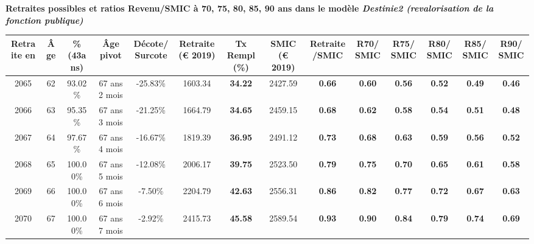  \vspace{0.1cm} 
{\bf \noindent Retraites possibles et ratios Revenu/SMIC à 70, 75, 80, 85, 90 ans dans le modèle \emph{Destinie2 (revalorisation de la fonction publique)}}  
 
\begin{adjustbox}{max width=\textwidth} 
\begin{tabular}[htb]{|c|c||c|c|c||c|c||c|c||c|c|c|c|c|} 
\hline 
 Retraite en &  Âge &  \%(43ans) &  Âge pivot &  Décote/Surcote &  Retraite (\euro{} 2019) &  Tx Rempl(\%) &  SMIC (\euro{} 2019) &  Retraite/SMIC &  R70/SMIC &  R75/SMIC &  R80/SMIC &  R85/SMIC &  R90/SMIC \\ 
\hline \hline 
 2065 &  62 &  93.02\% &  67 ans 2 mois &  -25.83\% &  1603.34 &  {\bf 34.22} &  2427.59 &  {\bf {\color{red} 0.66}} &  {\bf {\color{red} 0.60}} &  {\bf {\color{red} 0.56}} &  {\bf {\color{red} 0.52}} &  {\bf {\color{red} 0.49}} &  {\bf {\color{red} 0.46}} \\ 
\hline 
 2066 &  63 &  95.35\% &  67 ans 3 mois &  -21.25\% &  1664.79 &  {\bf 34.65} &  2459.15 &  {\bf {\color{red} 0.68}} &  {\bf {\color{red} 0.62}} &  {\bf {\color{red} 0.58}} &  {\bf {\color{red} 0.54}} &  {\bf {\color{red} 0.51}} &  {\bf {\color{red} 0.48}} \\ 
\hline 
 2067 &  64 &  97.67\% &  67 ans 4 mois &  -16.67\% &  1819.39 &  {\bf 36.95} &  2491.12 &  {\bf {\color{red} 0.73}} &  {\bf {\color{red} 0.68}} &  {\bf {\color{red} 0.63}} &  {\bf {\color{red} 0.59}} &  {\bf {\color{red} 0.56}} &  {\bf {\color{red} 0.52}} \\ 
\hline 
 2068 &  65 &  100.00\% &  67 ans 5 mois &  -12.08\% &  2006.17 &  {\bf 39.75} &  2523.50 &  {\bf {\color{red} 0.79}} &  {\bf {\color{red} 0.75}} &  {\bf {\color{red} 0.70}} &  {\bf {\color{red} 0.65}} &  {\bf {\color{red} 0.61}} &  {\bf {\color{red} 0.58}} \\ 
\hline 
 2069 &  66 &  100.00\% &  67 ans 6 mois &  -7.50\% &  2204.79 &  {\bf 42.63} &  2556.31 &  {\bf {\color{red} 0.86}} &  {\bf {\color{red} 0.82}} &  {\bf {\color{red} 0.77}} &  {\bf {\color{red} 0.72}} &  {\bf {\color{red} 0.67}} &  {\bf {\color{red} 0.63}} \\ 
\hline 
 2070 &  67 &  100.00\% &  67 ans 7 mois &  -2.92\% &  2415.73 &  {\bf 45.58} &  2589.54 &  {\bf {\color{red} 0.93}} &  {\bf {\color{red} 0.90}} &  {\bf {\color{red} 0.84}} &  {\bf {\color{red} 0.79}} &  {\bf {\color{red} 0.74}} &  {\bf {\color{red} 0.69}} \\ 
\hline 
\hline 
\end{tabular} 
\end{adjustbox} 
 
